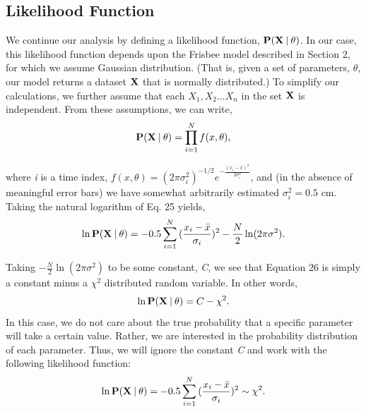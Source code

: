 \documentclass[a4paper,12pt, oneside]{article}
\newcommand\givenbase[1][]{\:#1\lvert\:}
\let\given\givenbase
\begin{document}
\subsection{Likelihood Function}

We continue our analysis by defining a likelihood function, $\bold{P({X}\given\theta})$. In our case, this likelihood function depends upon the Frisbee model described in Section 2, for which we assume Gaussian distribution. (That is, given a set of parameters, $\theta$, our model returns a dataset $\bold{X}$ that is normally distributed.) To simplify our calculations, we further assume that each $X_1, X_2...X_n$ in the set $\bold{X}$ is independent.  From these assumptions, we can write, 
\begin{equation}
\bold{P({X}\given\theta)}={\prod_{i=1}^{N} f(x,\theta)},
\end{equation}

where \textit{i} is a time index, $f(x,\theta)=(2\pi\sigma_{i}^2)^{-1/2}e^{-\frac{(x_{i}-\bar{x})^2}{2\sigma_i^2}}$, and (in the absence of meaningful error bars) we have somewhat arbitrarily estimated $\sigma_i^2=0.5$ cm. Taking the natural logarithm of Eq. 25 yields,
\begin{equation}
\ln\bold{P({X}\given\theta)}={-0.5 \sum_{i=1}^{N} {(\frac { x_i-\bar{x} } {\sigma_{i}}})^2} - \frac{N}{2}\ln(2\pi\sigma^2).
\end{equation}

Taking $-\frac{N}{2}\ln(2\pi\sigma^2)$ to be some constant, \textit{C}, we see that Equation 26 is simply a constant minus a $\chi^2$ distributed random variable. In other words, 
\begin{equation*}
\ln\bold{P({X}\given\theta)}=C-\chi^2.
\end{equation*}
In this case, we do not care about the true probability that a specific parameter will take a certain value. Rather, we are interested in the probability distribution of each parameter. Thus, we will ignore the constant \textit{C} and work with the following likelihood function:
\begin{equation}
\ln\bold{P({X}\given\theta)}={-0.5 \sum_{i=1}^{N} {(\frac { x_i-\bar{x} } {\sigma_{i}}})^2} \sim \chi^2.
\end{equation}
\end{document}
